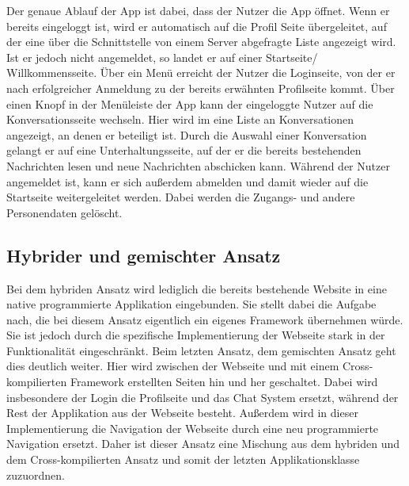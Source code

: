 Der genaue Ablauf der App ist dabei, dass der Nutzer die App öffnet. Wenn er bereits eingeloggt ist, wird er automatisch auf die Profil Seite übergeleitet, auf der eine über die Schnittstelle von einem Server abgefragte Liste angezeigt wird. Ist er jedoch nicht angemeldet, so landet er auf einer Startseite/ Willkommensseite. Über ein Menü erreicht der Nutzer die Loginseite, von der er nach erfolgreicher Anmeldung zu der bereits erwähnten Profilseite kommt. Über einen Knopf in der Menüleiste der App kann der eingeloggte Nutzer auf die Konversationsseite wechseln. Hier wird im eine Liste an Konversationen angezeigt, an denen er beteiligt ist. Durch die Auswahl einer Konversation gelangt er auf eine Unterhaltungsseite, auf der er die bereits bestehenden Nachrichten lesen und neue Nachrichten abschicken kann. Während der Nutzer angemeldet ist, kann er sich außerdem abmelden und damit wieder auf die Startseite weitergeleitet werden. Dabei werden die Zugangs- und andere Personendaten gelöscht.

\subsection{Hybrider und gemischter Ansatz}
Bei dem hybriden Ansatz wird lediglich die bereits bestehende Website in eine native programmierte Applikation eingebunden. Sie stellt dabei die Aufgabe nach, die bei diesem Ansatz eigentlich ein eigenes Framework übernehmen würde. Sie ist jedoch durch die spezifische Implementierung der Webseite stark in der Funktionalität eingeschränkt. Beim letzten Ansatz, dem gemischten Ansatz geht dies deutlich weiter. Hier wird zwischen der Webseite und mit einem Cross-kompilierten Framework erstellten Seiten hin und her geschaltet. Dabei wird insbesondere der Login die Profilseite und das Chat System ersetzt, während der Rest der Applikation aus der Webseite besteht. Außerdem wird in dieser Implementierung die Navigation der Webseite durch eine neu programmierte Navigation ersetzt. Daher ist dieser Ansatz eine Mischung aus dem hybriden und dem Cross-kompilierten Ansatz und somit der letzten Applikationsklasse zuzuordnen.


